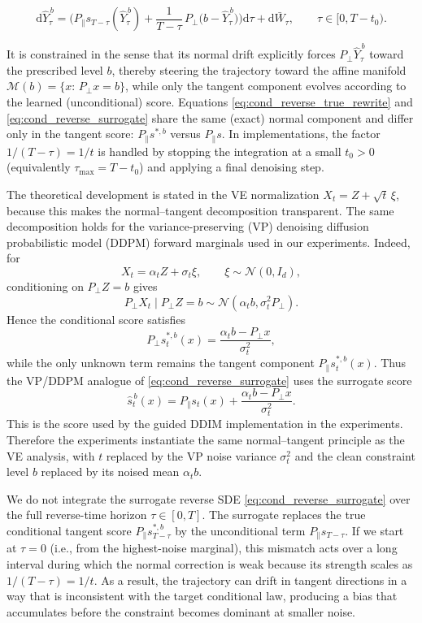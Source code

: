 \documentclass[twoside,11pt]{article}
\newcommand{\dd}{\mathrm{d}}
\newcommand{\Mc}{\mathcal{M}}
\numberwithin{equation}{section}
\begin{document}
\begin{equation}\label{eq:cond_reverse_surrogate}
\dd \hat Y_\tau^{\,b}
=
\Big(
P_{\parallel}s_{T-\tau}(\hat Y_\tau^{\,b})
+
\frac{1}{T-\tau}\,P_{\perp}\big(b-\hat Y_\tau^{\,b}\big)
\Big)\dd \tau
+
\dd \bar W_\tau,
\qquad \tau\in[0,T-t_0).
\end{equation}

 It is constrained in the sense that its normal drift explicitly forces \(P_\perp \hat Y_\tau^{\,b}\) toward the prescribed level \(b\), thereby steering the trajectory toward the affine manifold \(\Mc(b)=\{x:\,P_\perp x=b\}\), while only the tangent component evolves according to the learned (unconditional) score.
Equations \eqref{eq:cond_reverse_true_rewrite} and \eqref{eq:cond_reverse_surrogate} share the same (exact) normal
component and differ only in the tangent score: \(P_\parallel s^{*,b}\) versus \(P_\parallel s\).
In implementations, the factor \(1/(T-\tau)=1/t\) is handled by stopping the integration at a small
\(t_{0}>0\) (equivalently \(\tau_{\max}=T-t_{0}\)) and applying a final denoising step.

\begin{remark}
   The theoretical development is stated in the VE normalization
\(X_t=Z+\sqrt t\,\xi\), because this makes the normal--tangent decomposition
transparent. The same decomposition holds for the variance-preserving (VP) denoising
diffusion probabilistic model (DDPM) forward marginals used
in our experiments. Indeed, for
\[
X_t=\alpha_t Z+\sigma_t\xi,\qquad \xi\sim\mathcal N(0,I_d),
\]
conditioning on \(P_\perp Z=b\) gives
\[
P_\perp X_t\mid P_\perp Z=b
\sim
\mathcal N(\alpha_t b,\sigma_t^2P_\perp).
\]
Hence the conditional score satisfies
\[
P_\perp s_t^{*,b}(x)
=
\frac{\alpha_t b-P_\perp x}{\sigma_t^2},
\]
while the only unknown term remains the tangent component
\(P_\parallel s_t^{*,b}(x)\). Thus the VP/DDPM analogue of
\eqref{eq:cond_reverse_surrogate} uses the surrogate score
\[
\hat s_t^{\,b}(x)
=
P_\parallel s_t(x)
+
\frac{\alpha_t b-P_\perp x}{\sigma_t^2}.
\]
This is the score used by the guided DDIM implementation in the experiments.
Therefore the experiments instantiate the same normal--tangent principle as the
VE analysis, with \(t\) replaced by the VP noise variance \(\sigma_t^2\) and the
clean constraint level \(b\) replaced by its noised mean \(\alpha_t b\).

\end{remark}

We do not integrate the surrogate reverse SDE \eqref{eq:cond_reverse_surrogate} over the full reverse-time horizon
\(\tau\in[0,T]\). The surrogate replaces the true conditional tangent score \(P_\parallel s^{*,b}_{T-\tau}\) by the
unconditional term \(P_\parallel s_{T-\tau}\). If we start at \(\tau=0\) (i.e., from the highest-noise marginal),
this mismatch acts over a long interval during which the normal correction is weak because its strength scales as
\(1/(T-\tau)=1/t\). As a result, the trajectory can drift in tangent directions in a way that is inconsistent with
the target conditional law, producing a bias that accumulates before the constraint becomes dominant at smaller noise.
\end{document}
